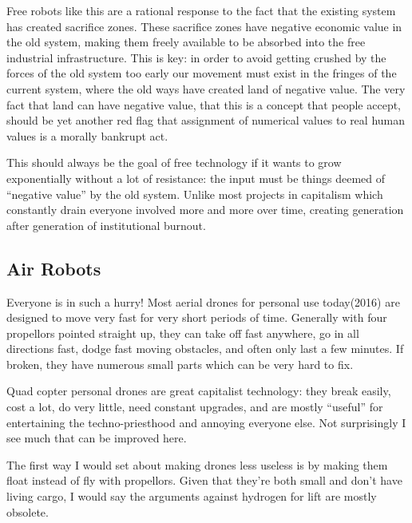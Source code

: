 Free robots like this are a rational response to the fact that the
existing system has created sacrifice zones. These sacrifice zones have
negative economic value in the old system, making them freely available
to be absorbed into the free industrial infrastructure. This is key: in
order to avoid getting crushed by the forces of the old system too early
our movement must exist in the fringes of the current system, where the
old ways have created land of negative value. The very fact that land
can have negative value, that this is a concept that people accept,
should be yet another red flag that assignment of numerical values to
real human values is a morally bankrupt act.

This should always be the goal of free technology if it wants to grow
exponentially without a lot of resistance: the input must be things
deemed of ``negative value'' by the old system. Unlike most projects in
capitalism which constantly drain everyone involved more and more over
time, creating generation after generation of institutional burnout.

\subsection{Air Robots}\label{air-robots}

Everyone is in such a hurry! Most aerial drones for personal use
today(2016) are designed to move very fast for very short periods of
time. Generally with four propellors pointed straight up, they can take
off fast anywhere, go in all directions fast, dodge fast moving
obstacles, and often only last a few minutes. If broken, they have
numerous small parts which can be very hard to fix.

Quad copter personal drones are great capitalist technology: they break
easily, cost a lot, do very little, need constant upgrades, and are
mostly ``useful'' for entertaining the techno-priesthood and annoying
everyone else. Not surprisingly I see much that can be improved here.

The first way I would set about making drones less useless is by making
them float instead of fly with propellors. Given that they're both small
and don't have living cargo, I would say the arguments against hydrogen
for lift are mostly obsolete.

